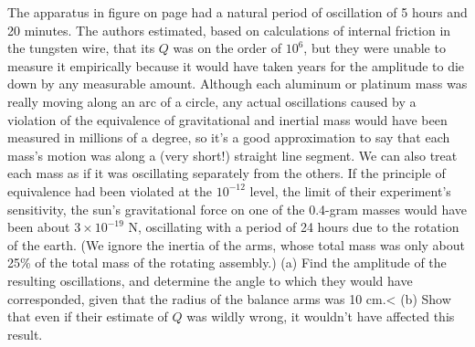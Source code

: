 The apparatus in figure  on page \pageref{fig:braginskii}
        had a natural period of oscillation of 5 hours and 20 minutes.
        The authors estimated, based on calculations of internal friction in the tungsten
        wire, that its $Q$ was on the order of $10^6$, but they were unable
        to measure it empirically because it would have taken years for the amplitude
        to die down by any measurable amount. Although each aluminum or platinum
        mass was really moving along an arc of a circle, any actual oscillations caused
        by a violation of the equivalence of gravitational and inertial mass
         would have been measured in millions
        of a degree, so it's a good approximation to say that each mass's motion was
        along a (very short!) straight line segment. We can also treat each mass as if it
        was oscillating separately from the others. If the principle of equivalence
        had been violated at the $10^{-12}$ level, the limit of their experiment's
        sensitivity, the sun's gravitational force on one of the 0.4-gram masses
        would have been about $3\times10^{-19}$ N, oscillating with a period of
        24 hours due to the rotation of the earth. (We ignore the inertia of the arms,
        whose total mass was only about 25\% of the total mass of the rotating assembly.)\hwendpart
        (a) Find the amplitude of the resulting
        oscillations, and determine the angle to which they would have corresponded,
        given that the radius of the balance arms was 10 cm.<%
        (b) Show that even if their estimate of $Q$ was wildly wrong, it wouldn't have affected this
        result.
